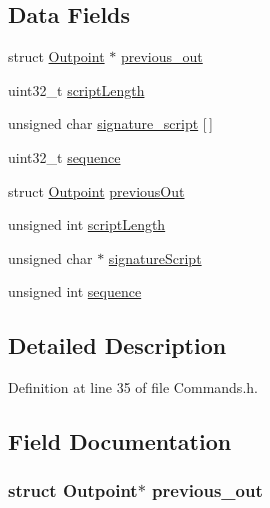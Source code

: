 \subsection*{Data Fields}
\begin{DoxyCompactItemize}
\item 
struct \hyperlink{struct_outpoint}{Outpoint} $\ast$ \hyperlink{struct_tranx_in_a694240f5463d28f9cb6cb2f8de4a5a45}{previous\_\-out}
\item 
uint32\_\-t \hyperlink{struct_tranx_in_a756d651ccdd4c06f59685e337cf2e840}{scriptLength}
\item 
unsigned char \hyperlink{struct_tranx_in_acd5b457285f7e816fbb23777406a701a}{signature\_\-script} \mbox{[}$\,$\mbox{]}
\item 
uint32\_\-t \hyperlink{struct_tranx_in_a0ab03ef2cc38198d3666a992a245fddf}{sequence}
\item 
struct \hyperlink{struct_outpoint}{Outpoint} \hyperlink{struct_tranx_in_a2889e84785c9df5cba88abaaa03eb206}{previousOut}
\item 
unsigned int \hyperlink{struct_tranx_in_a00601157399e1c73bddee66c716926f4}{scriptLength}
\item 
unsigned char $\ast$ \hyperlink{struct_tranx_in_a3d518a810ef5d47feb63829a61ced9e1}{signatureScript}
\item 
unsigned int \hyperlink{struct_tranx_in_a18ec6560d3738f9c1bc8ed50f2e570c1}{sequence}
\end{DoxyCompactItemize}


\subsection{Detailed Description}


Definition at line 35 of file Commands.h.



\subsection{Field Documentation}
\hypertarget{struct_tranx_in_a694240f5463d28f9cb6cb2f8de4a5a45}{
\subsubsection[{previous\_\-out}]{\setlength{\rightskip}{0pt plus 5cm}struct {\bf Outpoint}$\ast$ {\bf previous\_\-out}}}
\label{struct_tranx_in_a694240f5463d28f9cb6cb2f8de4a5a45}



